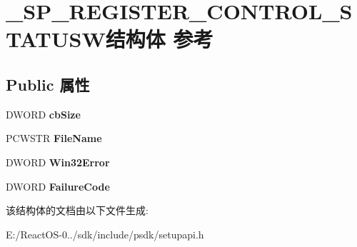 \hypertarget{struct___s_p___r_e_g_i_s_t_e_r___c_o_n_t_r_o_l___s_t_a_t_u_s_w}{}\section{\+\_\+\+S\+P\+\_\+\+R\+E\+G\+I\+S\+T\+E\+R\+\_\+\+C\+O\+N\+T\+R\+O\+L\+\_\+\+S\+T\+A\+T\+U\+S\+W结构体 参考}
\label{struct___s_p___r_e_g_i_s_t_e_r___c_o_n_t_r_o_l___s_t_a_t_u_s_w}
\subsection*{Public 属性}
\begin{DoxyCompactItemize}
\item 
\mbox{\label{struct___s_p___r_e_g_i_s_t_e_r___c_o_n_t_r_o_l___s_t_a_t_u_s_w_aff449e431c4f237af70969db94446661}} 
D\+W\+O\+RD {\bfseries cb\+Size}
\item 
\mbox{\label{struct___s_p___r_e_g_i_s_t_e_r___c_o_n_t_r_o_l___s_t_a_t_u_s_w_ab8ad92085a720218d9a92add1a632b7b}} 
P\+C\+W\+S\+TR {\bfseries File\+Name}
\item 
\mbox{\label{struct___s_p___r_e_g_i_s_t_e_r___c_o_n_t_r_o_l___s_t_a_t_u_s_w_acdb01afe49abf3cd3fb0e7957a1558d3}} 
D\+W\+O\+RD {\bfseries Win32\+Error}
\item 
\mbox{\label{struct___s_p___r_e_g_i_s_t_e_r___c_o_n_t_r_o_l___s_t_a_t_u_s_w_a9d4e80d0e28ad51fbccebac35b10a6fb}} 
D\+W\+O\+RD {\bfseries Failure\+Code}
\end{DoxyCompactItemize}


该结构体的文档由以下文件生成\+:\begin{DoxyCompactItemize}
\item 
E\+:/\+React\+O\+S-\/0../sdk/include/psdk/setupapi.\+h\end{DoxyCompactItemize}
